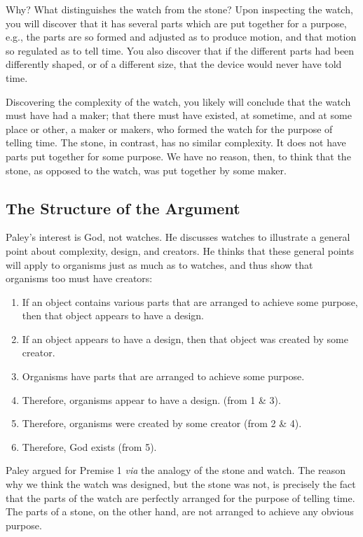 \documentclass[]{article}
\begin{document}
Why? What distinguishes the watch from the stone? Upon inspecting the
watch, you will discover that it has several parts which are put
together for a purpose, e.g., the parts are so formed and adjusted as to
produce motion, and that motion so regulated as to tell time. You also
discover that if the different parts had been differently shaped, or of
a different size, that the device would never have told time.

Discovering the complexity of the watch, you likely will conclude that
the watch must have had a maker; that there must have existed, at
sometime, and at some place or other, a maker or makers, who formed the
watch for the purpose of telling time. The stone, in contrast, has no
similar complexity. It does not have parts put together for some
purpose. We have no reason, then, to think that the stone, as opposed to
the watch, was put together by some maker.

\subsection{The Structure of the
Argument}\label{the-structure-of-the-argument}

Paley's interest is God, not watches. He discusses watches to illustrate
a general point about complexity, design, and creators. He thinks that
these general points will apply to organisms just as much as to watches,
and thus show that organisms too must have creators:

\begin{enumerate}
\def\labelenumi{\arabic{enumi}.}
\itemsep1pt\parskip0pt
\item
  If an object contains various parts that are arranged to achieve some
  purpose, then that object appears to have a design.
\item
  If an object appears to have a design, then that object was created by
  some creator.
\item
  Organisms have parts that are arranged to achieve some purpose.
\item
  Therefore, organisms appear to have a design. (from 1 \& 3).
\item
  Therefore, organisms were created by some creator (from 2 \& 4).
\item
  Therefore, God exists (from 5).
\end{enumerate}

Paley argued for Premise 1 \emph{via} the analogy of the stone and
watch. The reason why we think the watch was designed, but the stone was
not, is precisely the fact that the parts of the watch are perfectly
arranged for the purpose of telling time. The parts of a stone, on the
other hand, are not arranged to achieve any obvious purpose.
\end{document}
